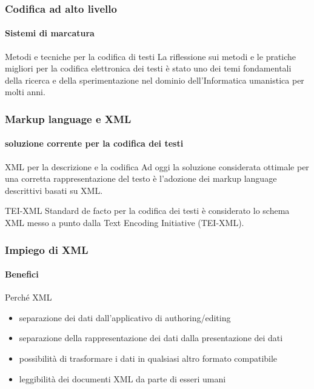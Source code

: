 \begin{frame}
	\frametitle{Codifica ad alto livello}
	\framesubtitle{Sistemi di marcatura}
	\addtocounter{nframe}{1}

	\begin{block}{Metodi e tecniche per la codifica di testi}
		La riflessione sui metodi e le pratiche migliori per la codifica elettronica dei testi è stato uno dei temi fondamentali della ricerca e della sperimentazione nel dominio dell’Informatica umanistica per molti anni.
	\end{block}

\end{frame}

\begin{frame}
	\frametitle{Markup language e XML}
	\framesubtitle{soluzione corrente per la codifica dei testi}
	\addtocounter{nframe}{1}

	\begin{block}{XML per la descrizione e la codifica}
		Ad oggi la soluzione considerata ottimale per una corretta rappresentazione del testo è l'adozione dei markup language descrittivi basati su XML.
	\end{block}

	\begin{block}{TEI-XML}
		Standard de facto per la codifica dei testi è considerato lo schema XML messo a punto dalla Text Encoding Initiative (TEI-XML).
	\end{block}

\end{frame}

\begin{frame}
	\frametitle{Impiego di XML}
	\framesubtitle{Benefici}
	\addtocounter{nframe}{1}

	\begin{block}{Perché XML}
		\begin{itemize}
			\item separazione dei dati dall'applicativo di authoring/editing 
			\item separazione della rappresentazione dei dati dalla presentazione dei dati
			\item possibilità di trasformare i dati in qualsiasi altro formato compatibile
			\item leggibilità dei documenti XML da parte di esseri umani
		\end{itemize}

	\end{block}
	

\end{frame}

